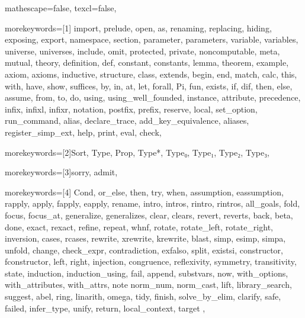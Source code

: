 
 {

mathescape=false,
texcl=false,

morekeywords=[1]{
		import, prelude,
		open, as, renaming, replacing, hiding, exposing, export,
		namespace, section,
		parameter, parameters, variable, variables, universe, universes, include, omit,
		protected, private, noncomputable, meta, mutual, theory,
		definition, def, constant, constants, lemma, theorem, example, axiom, axioms,
		inductive, structure, class, extends,
		begin, end, match, calc, this, with, have, show, suffices, by, in, at, let, forall, Pi, fun,
		exists, if, dif, then, else, assume, from, to, do,
		using, using_well_founded,
		instance, attribute,
		precedence, infix, infixl, infixr, notation, postfix, prefix,
		reserve, local,
		set_option, run_command,
		alias, declare_trace, add_key_equivalence, aliases, register_simp_ext,
		help, print, eval, check},

morekeywords=[2]{Sort, Type, Prop, Type*, Type₀, Type₁, Type₂, Type₃},

morekeywords=[3]{sorry, admit},

morekeywords=[4]{
		Cond, or_else, then, try, when, assumption, eassumption, rapply,
		apply, fapply, eapply, rename, intro, intros, rintro, rintros, all_goals, fold, focus, focus_at,
		generalize, generalizes, clear, clears, revert, reverts, back, beta, done, exact, rexact,
		refine, repeat, whnf, rotate, rotate_left, rotate_right, inversion, cases, rcases, rewrite,
		xrewrite, krewrite, blast, simp, esimp, simpa, unfold, change, check_expr, contradiction,
		exfalso, split, existsi, constructor, fconstructor, left, right, injection, congruence, reflexivity,
		symmetry, transitivity, state, induction, induction_using, fail, append,
		substvars, now, with_options, with_attributes, with_attrs, note
		norm_num, norm_cast, lift, library_search, suggest, abel, ring, linarith, omega, tidy, finish,
		solve_by_elim, clarify, safe,
		failed, infer_type, unify, return, local_context, target
	},


}
